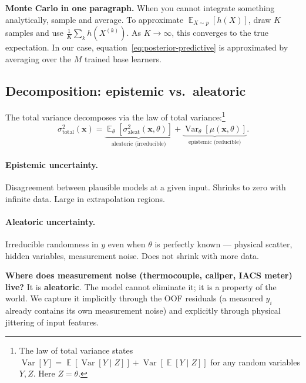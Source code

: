 \documentclass[11pt,a4paper]{article}
\DeclareMathOperator{\Var}{Var}
\DeclareMathOperator{\E}{\mathbb{E}}
\begin{document}
\begin{recapbox}
\textbf{Monte Carlo in one paragraph.} When you cannot integrate something analytically, sample and average. To approximate $\E_{X \sim p}[h(X)]$, draw $K$ samples and use $\frac{1}{K}\sum_k h(X^{(k)})$. As $K \to \infty$, this converges to the true expectation. In our case, equation~\eqref{eq:posterior-predictive} is approximated by averaging over the $M$ trained base learners.
\end{recapbox}

\subsection{Decomposition: epistemic vs.\ aleatoric}

The total variance decomposes via the law of total variance:\footnote{The law of total variance states $\Var[Y] = \E[\Var[Y \mid Z]] + \Var[\E[Y \mid Z]]$ for any random variables $Y, Z$. Here $Z = \theta$.}
\begin{equation}
\sigma_{\text{total}}^2(\bm x)
= \underbrace{\E_\theta\!\left[ \sigma^2_{\text{aleat}}(\bm x, \theta) \right]}_{\text{aleatoric (irreducible)}}
+ \underbrace{\Var_\theta\!\left[ \mu(\bm x, \theta) \right]}_{\text{epistemic (reducible)}}.
\label{eq:total-variance-decomp}
\end{equation}

\paragraph{Epistemic uncertainty.} Disagreement between plausible models at a given input. Shrinks to zero with infinite data. Large in extrapolation regions.

\paragraph{Aleatoric uncertainty.} Irreducible randomness in $y$ even when $\theta$ is perfectly known --- physical scatter, hidden variables, measurement noise. Does not shrink with more data.

\begin{intuitionbox}
\textbf{Where does measurement noise (thermocouple, caliper, IACS meter) live?} It is \textbf{aleatoric}. The model cannot eliminate it; it is a property of the world. We capture it implicitly through the OOF residuals (a measured $y_i$ already contains its own measurement noise) and explicitly through physical jittering of input features.
\end{intuitionbox}
\end{document}
